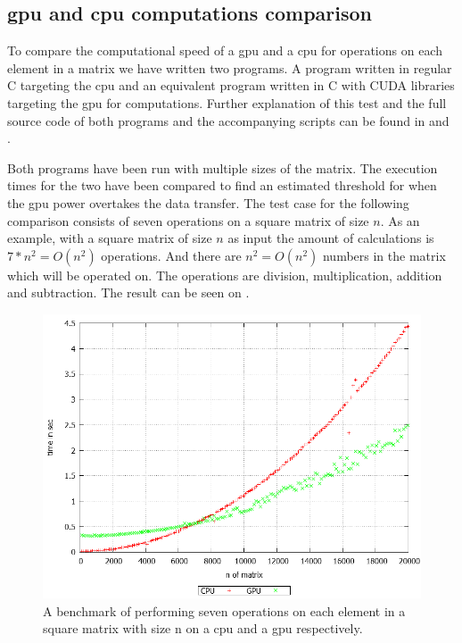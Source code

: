 \subsection{\acrshort{gpu} and \acrshort{cpu} computations comparison}\label{sub:gpubenchmark}
To compare the computational speed of a \acrshort{gpu} and a \acrshort{cpu} for operations on each element in a matrix we have written two programs.
A program written in regular C targeting the \acrshort{cpu} and an equivalent program written in C with CUDA libraries targeting the \acrshort{gpu} for computations.
Further explanation of this test and the full source code of both programs and the accompanying scripts can be found in  and .

Both programs have been run with multiple sizes of the matrix.
The execution times for the two have been compared to find an estimated threshold for when the \acrshort{gpu} power overtakes the data transfer.
The test case for the following comparison consists of seven operations on a square matrix of size $n$.
As an example, with a square matrix of size $n$ as input the amount of calculations is $7*n^2 = O(n^2)$ operations. 
And there are $n^2 = O(n^2)$ numbers in the matrix which will be operated on.
The operations are division, multiplication, addition and subtraction.
The result can be seen on .
\begin{figure}[h!]
\centering
 \includegraphics[width=1\textwidth]{figures/benchmark.png} %
\caption{A benchmark of performing seven operations on each element in a square matrix with size n on a \acrshort{cpu} and a \acrshort{gpu} respectively.}\label{image:benchmark}
\vspace{-15pt}
\end{figure}

